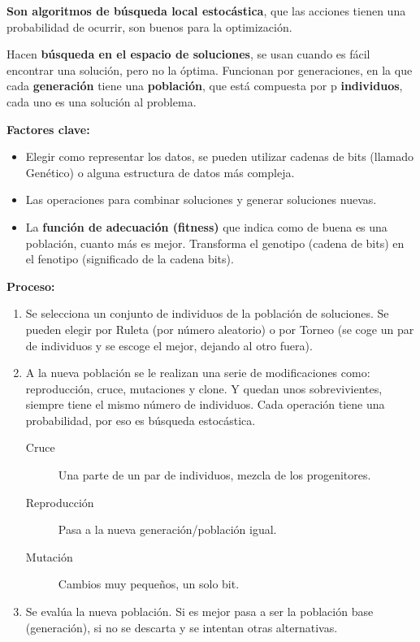 \documentclass[12pt, twoside, openright]{report} %
\begin{document}
\textbf{Son algoritmos de búsqueda local estocástica}, que las acciones tienen una probabilidad de ocurrir, son buenos para la optimización.

Hacen \textbf{búsqueda en el espacio de soluciones}, se usan cuando es fácil encontrar una solución, pero no la óptima. Funcionan por generaciones, en la que cada \textbf{generación} tiene una \textbf{población}, que está compuesta por p \textbf{individuos}, cada uno es una solución al problema.

\textbf{Factores clave:}
\begin{itemize}
	\item Elegir como representar los datos, se pueden utilizar cadenas de bits (llamado Genético) o alguna estructura de datos más compleja.
	\item Las operaciones para combinar soluciones y generar soluciones nuevas.
	\item La \textbf{función de adecuación (fitness)} que indica como de buena es una población, cuanto más es mejor. Transforma el genotipo (cadena de bits) en el fenotipo (significado de la cadena bits).
\end{itemize}

\textbf{Proceso:}
\begin{enumerate}
	\item Se selecciona un conjunto de individuos de la población de soluciones. Se pueden elegir por Ruleta (por número aleatorio) o por Torneo (se coge un par de individuos y se escoge el mejor, dejando al otro fuera).
	\item A la nueva población se le realizan una serie de modificaciones como: reproducción, cruce, mutaciones y clone. Y quedan unos sobrevivientes, siempre tiene el mismo número de individuos.
	      Cada operación tiene una probabilidad, por eso es búsqueda estocástica.
	      \begin{description}
		      \item[Cruce] Una parte de un par de individuos, mezcla de los progenitores.
		      \item[Reproducción] Pasa a la nueva generación/población igual.
		      \item[Mutación] Cambios muy pequeños, un solo bit.
	      \end{description}
	\item Se evalúa la nueva población. Si es mejor pasa a ser la población base (generación), si no se descarta y se intentan otras alternativas.
\end{enumerate}
\end{document}
